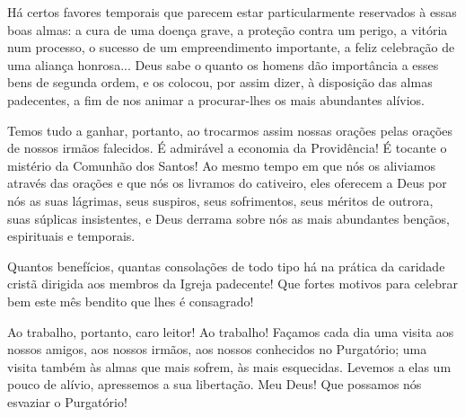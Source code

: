 Há certos favores temporais que parecem estar particularmente reservados à essas boas almas: a cura de uma doença grave, a proteção contra um perigo, a vitória num processo, o sucesso de um empreendimento importante, a feliz celebração de uma aliança honrosa... Deus sabe o quanto os homens dão importância a esses bens de segunda ordem, e os colocou, por assim dizer, à disposição das almas padecentes, a fim de nos animar a procurar-lhes os mais abundantes alívios.

Temos tudo a ganhar, portanto, ao trocarmos assim nossas orações pelas orações de nossos irmãos falecidos. É admirável a economia da Providência! É tocante o mistério da Comunhão dos Santos! Ao mesmo tempo em que nós os aliviamos através das orações e que nós os livramos do cativeiro, eles oferecem a Deus por nós as suas lágrimas, seus suspiros, seus sofrimentos, seus méritos de outrora, suas súplicas insistentes, e Deus derrama sobre nós as mais abundantes bençãos, espirituais e temporais.

Quantos benefícios, quantas consolações de todo tipo há na prática da caridade cristã dirigida aos membros da Igreja padecente! Que fortes motivos para celebrar bem este mês bendito que lhes é consagrado!

Ao trabalho, portanto, caro leitor! Ao trabalho! Façamos cada dia uma visita aos nossos amigos, aos nossos irmãos, aos nossos conhecidos no Purgatório; uma visita também às almas que mais sofrem, às mais esquecidas. Levemos a elas um pouco de alívio, apressemos a sua libertação. Meu Deus! Que possamos nós esvaziar o Purgatório!
